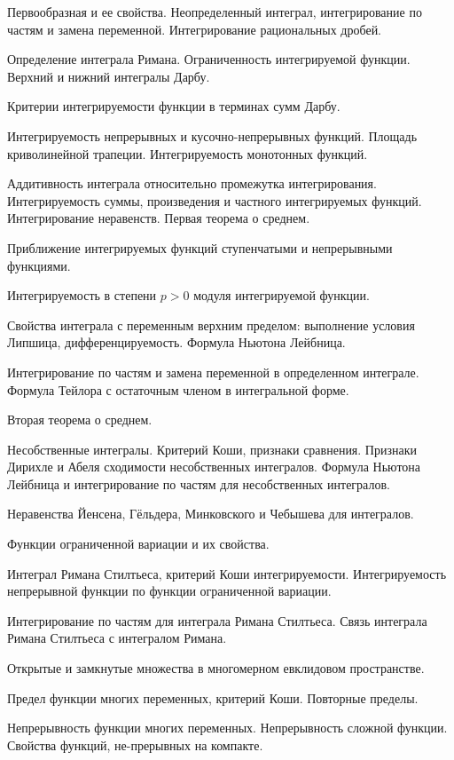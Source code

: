 \documentclass[a4paper]{article}
\begin{document}
\begin{nums}{-3}
\item Первообразная и ее свойства. Неопределенный интеграл, интегрирование по частям и замена переменной.
Интегрирование рациональных дробей.
\item Определение интеграла Римана. Ограниченность интегрируемой функции. Верхний и нижний интегралы Дарбу.
\item Критерии интегрируемости функции в терминах сумм Дарбу.
\item Интегрируемость непрерывных и кусочно-непрерывных функций. Площадь криволинейной трапеции.
Интегрируемость монотонных функций.
\item Аддитивность интеграла относительно промежутка интегрирования. Интегрируемость
суммы, произведения и частного интегрируемых функций. Интегрирование неравенств. Первая теорема о среднем.
\item Приближение интегрируемых функций ступенчатыми и непрерывными функциями.
\item Интегрируемость в степени $p>0$ модуля интегрируемой функции.
\item Свойства интеграла с переменным верхним пределом: выполнение условия Липшица, дифференцируемость.
Формула Ньютона Лейбница.
\item Интегрирование по частям и замена переменной в определенном интеграле. Формула Тейлора с остаточным
членом в интегральной форме.
\item Вторая теорема о среднем.
\item Несобственные интегралы. Критерий Коши, признаки сравнения. Признаки Дирихле и Абеля
сходимости несобственных интегралов. Формула Ньютона Лейбница и интегрирование по частям для несобственных интегралов.
\item Неравенства Йенсена, Гёльдера, Минковского и Чебышева для интегралов.
\item Функции ограниченной вариации и их свойства.
\item Интеграл Римана Стилтьеса, критерий Коши интегрируемости. Интегрируемость непрерывной функции
по функции ограниченной вариации.
\item Интегрирование по частям для интеграла Римана Стилтьеса. Связь интеграла Римана Стилтьеса с интегралом Римана.
\item Открытые и замкнутые множества в многомерном евклидовом пространстве.
\item Предел функции многих переменных, критерий Коши. Повторные пределы.
\item Непрерывность функции многих переменных. Непрерывность сложной функции. Свойства функций, не-\break прерывных на компакте.

\end{nums}
\end{document}
